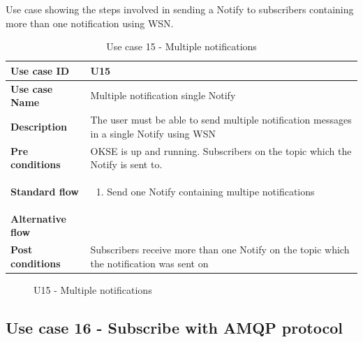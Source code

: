 Use case showing the steps involved in sending a Notify to subscribers containing more than one notification using WSN. 

\begin{table}[ht!]
\centering
\begin{tabular}{|l|p{5cm}|}
\hline
\textbf{Use case ID} & U15 \\ \hline
\textbf{Use case Name} & Multiple notification single Notify\\ \hline
\textbf{Description} & The user must be able to send multiple notification messages in a single Notify using WSN\\ \hline
\textbf{Pre conditions} & OKSE is up and running. Subscribers on the topic which the Notify is sent to. \\ \hline
\textbf{Standard flow} & \begin{enumerate}
\item Send one Notify containing multipe notifications
\end{enumerate} \\ \hline
\textbf{Alternative flow} & \\ \hline
\textbf{Post conditions} & Subscribers receive more than one Notify on the topic which the notification was sent on\\ \hline
\end{tabular}
\caption{Use case 15 - Multiple notifications}
\label{uc15}
\end{table}

\begin{center}
  \begin{figure}[ht!]
    \caption{U15 - Multiple notifications}
    \label{fig:u15}
  \end{figure}
\end{center}

\clearpage

\subsection{Use case 16 - Subscribe with AMQP protocol}
\label{subsec:requirements_engineering-use_cases-}

